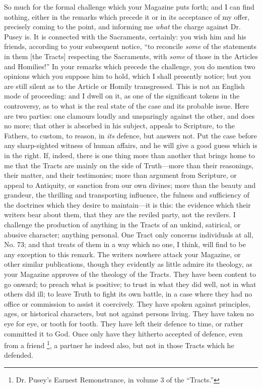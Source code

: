 So much for the formal challenge which your
Magazine puts forth; and I can find nothing, either in the remarks
which precede it or in its acceptance of my offer, precisely coming to
the point, and informing me \emph{what} the charge against Dr. Pusey
is. It is connected with the Sacraments, certainly: you wish him and
his friends, according to your subsequent notice, ``to reconcile \emph{some}
of the statements in them [the Tracts] respecting the Sacraments, with
\emph{some} of those in the Articles and Homilies!'' In your remarks
which precede the challenge, you do mention two opinions which you
suppose him to hold, which I shall presently notice; but you are still
silent as to the Article or Homily transgressed. This is not an
English mode of proceeding: and I dwell on it, as one of the
significant tokens in the controversy, as to what is the real state of
the case and its probable issue. Here are two parties: one clamours
loudly and unsparingly against the other, and does no more; that other
is absorbed in his subject, appeals to Scripture, to the Fathers, to
custom, to reason, in \emph{its} defence, but answers not. Put the
case before any sharp-sighted witness of human affairs, and he will
give a good guess which is in the right. If, indeed, there is one
thing more than another that brings home to me that the Tracts are
mainly on the side of Truth—more than their reasonings, their
matter, and their testimonies; more than argument from Scripture, or
appeal to Antiquity, or sanction from our own divines; more than the
beauty and grandeur, the thrilling and transporting influence,
the fulness and sufficiency of the doctrines which they desire to
maintain—it is this: the evidence which their writers bear about
them, that they are the reviled party, not the revilers. I challenge
the production of anything in the Tracts of an unkind, satirical, or
abusive character; anything personal. One Tract only concerns
individuals at all, No. 73; and that treats of them in a way which no
one, I think, will find to be any exception to this remark. The
writers nowhere attack your Magazine, or other similar publications,
though they evidently as little admire its theology, as your Magazine
approves of the theology of the Tracts. They have been content to go
onward; to preach what is positive; to trust in what they did well,
not in what others did ill; to leave Truth to fight its own battle, in
a case where they had no office or commission to assist it coercively.
They have spoken against principles, ages, or historical characters,
but not against persons living. They have taken no eye for eye, or
tooth for tooth. They have left their defence to time, or rather
committed it to God. Once only have they hitherto accepted of defence,
even from a friend \footnote{Dr. Pusey's Earnest Remonstrance, in volume 3 of the ``Tracts.''}, a
partner he indeed also, but not in those Tracts which he defended.

